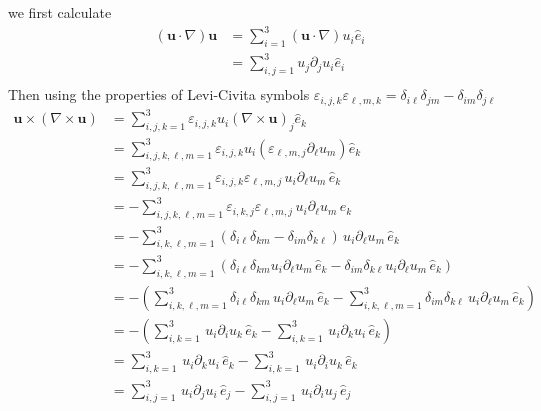 we first calculate 
\begin{equation}
\begin{aligned}
\left(\textbf{u}\cdot \nabla\right)\textbf{u}
&= \sum_{i=1}^{3}\left(\textbf{u}\cdot \nabla\right)u_i\hat{e}_i\\
&= \sum_{i,j=1}^{3}u_j\partial_ju_i\hat{e}_i\\
\end{aligned}
\end{equation}
Then using the properties of Levi-Civita symbols $\varepsilon_{i,j,k}\varepsilon_{\ell,m,k} = \delta_{i\ell}\delta_{jm}-\delta_{im}\delta_{j\ell}$
\begin{equation}
\begin{aligned}
\textbf{u}\times\left(\nabla\times\textbf{u}\right)
&= \sum_{i,j,k=1}^{3}
\varepsilon_{i,j,k} u_i\left(\nabla\times\textbf{u}\right)_j\hat{e}_k\\
&= \sum_{i,j,k,\ell,m=1}^{3}
\varepsilon_{i,j,k} u_i\left(\varepsilon_{\ell,m,j} \partial_{\ell}u_m\right)\hat{e}_k\\
&= \sum_{i,j,k,\ell,m=1}^{3}
\varepsilon_{i,j,k}\varepsilon_{\ell,m,j}\, u_i\partial_{\ell}u_m \,\hat{e}_k\\
&= -\sum_{i,j,k,\ell,m=1}^{3}
\varepsilon_{i,k,j}\varepsilon_{\ell,m,j}\, u_i\partial_{\ell}u_m \,\hat{e}_k\\
&= -\sum_{i,k,\ell,m=1}^{3}
\left(\delta_{i\ell}\delta_{km} - \delta_{im}\delta_{k\ell}\right)\, u_i\partial_{\ell}u_m \,\hat{e}_k\\
&= -\sum_{i,k,\ell,m=1}^{3}
\left(\delta_{i\ell}\delta_{km}u_i\partial_{\ell}u_m \,\hat{e}_k - \delta_{im}\delta_{k\ell}u_i\partial_{\ell}u_m \,\hat{e}_k\right)\\
&= -\left(
\sum_{i,k,\ell,m=1}^{3}\delta_{i\ell}\delta_{km}\,u_i\partial_{\ell}u_m \,\hat{e}_k
-
\sum_{i,k,\ell,m=1}^{3}\delta_{im}\delta_{k\ell}\,u_i\partial_{\ell}u_m \,\hat{e}_k
\right)\\
&= -\left(
\sum_{i,k=1}^{3}\,u_i\partial_{i}u_k \,\hat{e}_k
-
\sum_{i,k=1}^{3}\,u_i\partial_{k}u_i \,\hat{e}_k
\right)\\
&= \sum_{i,k=1}^{3}\,u_i\partial_{k}u_i \,\hat{e}_k -\sum_{i,k=1}^{3}\,u_i\partial_{i}u_k \,\hat{e}_k \\
&= \sum_{i,j=1}^{3}\,u_i\partial_{j}u_i \,\hat{e}_j -\sum_{i,j=1}^{3}\,u_i\partial_{i}u_j \,\hat{e}_j \\
\end{aligned}
\end{equation}


